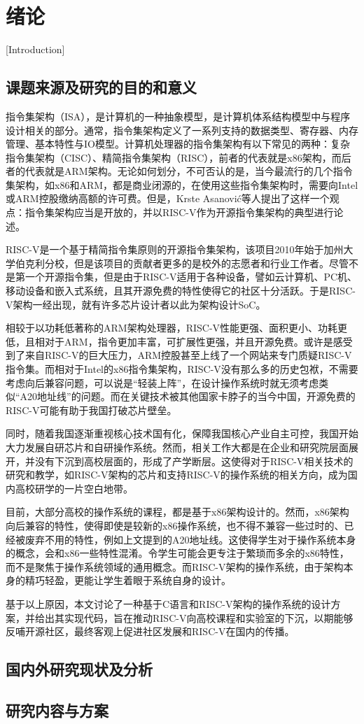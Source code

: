 
\chapter{绪论}[Introduction]

\section{课题来源及研究的目的和意义}

指令集架构（ISA），是计算机的一种抽象模型，是计算机体系结构模型中与程序设计相关的部分。通常，指令集架构定义了一系列支持的数据类型、寄存器、内存管理、基本特性与IO模型。计算机处理器的指令集架构有以下常见的两种：复杂指令集架构（CISC）、精简指令集架构（RISC），前者的代表就是x86架构，而后者的代表就是ARM架构。无论如何划分，不可否认的是，当今最流行的几个指令集架构，如x86和ARM，都是商业闭源的，在使用这些指令集架构时，需要向Intel或ARM控股缴纳高额的许可费。但是，Krste Asanović等人提出了这样一个观点：指令集架构应当是开放的，并以RISC-V作为开源指令集架构的典型进行论述。

RISC-V是一个基于精简指令集原则的开源指令集架构，该项目2010年始于加州大学伯克利分校，但是该项目的贡献者更多的是校外的志愿者和行业工作者。尽管不是第一个开源指令集，但是由于RISC-V适用于各种设备，譬如云计算机、PC机、移动设备和嵌入式系统，且其开源免费的特性使得它的社区十分活跃。于是RISC-V架构一经出现，就有许多芯片设计者以此为架构设计SoC。

相较于以功耗低著称的ARM架构处理器，RISC-V性能更强、面积更小、功耗更低，且相对于ARM，指令更加丰富，可扩展性更强，并且开源免费。或许是感受到了来自RISC-V的巨大压力，ARM控股甚至上线了一个网站来专门质疑RISC-V指令集。而相对于Intel的x86指令集架构，RISC-V没有那么多的历史包袱，不需要考虑向后兼容问题，可以说是“轻装上阵”，在设计操作系统时就无须考虑类似“A20地址线”的问题。而在关键技术被其他国家卡脖子的当今中国，开源免费的RISC-V可能有助于我国打破芯片壁垒。

同时，随着我国逐渐重视核心技术国有化，保障我国核心产业自主可控，我国开始大力发展自研芯片和自研操作系统。然而，相关工作大都是在企业和研究院层面展开，并没有下沉到高校层面的，形成了产学断层。这使得对于RISC-V相关技术的研究和教学，如RISC-V架构的芯片和支持RISC-V的操作系统的相关方向，成为国内高校研学的一片空白地带。

目前，大部分高校的操作系统的课程，都是基于x86架构设计的。然而，x86架构向后兼容的特性，使得即使是较新的x86操作系统，也不得不兼容一些过时的、已经被废弃不用的特性，例如上文提到的A20地址线。这使得学生对于操作系统本身的概念，会和x86一些特性混淆。令学生可能会更专注于繁琐而多余的x86特性，而不是聚焦于操作系统领域的通用概念。而RISC-V架构的操作系统，由于架构本身的精巧轻盈，更能让学生着眼于系统自身的设计。

基于以上原因，本文讨论了一种基于C语言和RISC-V架构的操作系统的设计方案，并给出其实现代码，旨在推动RISC-V向高校课程和实验室的下沉，以期能够反哺开源社区，最终客观上促进社区发展和RISC-V在国内的传播。

\section{国内外研究现状及分析}

\section{研究内容与方案}